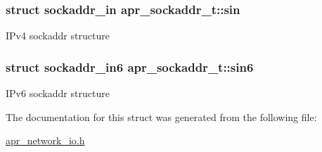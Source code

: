 \subsubsection[{\texorpdfstring{sin}{sin}}]{\setlength{\rightskip}{0pt plus 5cm}struct sockaddr\+\_\+in apr\+\_\+sockaddr\+\_\+t\+::sin}\hypertarget{structapr__sockaddr__t_a7d5cf0290260c3c448360fc819b28714}{}\label{structapr__sockaddr__t_a7d5cf0290260c3c448360fc819b28714}
I\+Pv4 sockaddr structure 
\subsubsection[{\texorpdfstring{sin6}{sin6}}]{\setlength{\rightskip}{0pt plus 5cm}struct sockaddr\+\_\+in6 apr\+\_\+sockaddr\+\_\+t\+::sin6}\hypertarget{structapr__sockaddr__t_ab3a1f900d2a1e58d337a61d99e94d3f9}{}\label{structapr__sockaddr__t_ab3a1f900d2a1e58d337a61d99e94d3f9}
I\+Pv6 sockaddr structure 

The documentation for this struct was generated from the following file\+:\begin{DoxyCompactItemize}
\item 
\hyperlink{apr__network__io_8h}{apr\+\_\+network\+\_\+io.\+h}\end{DoxyCompactItemize}
